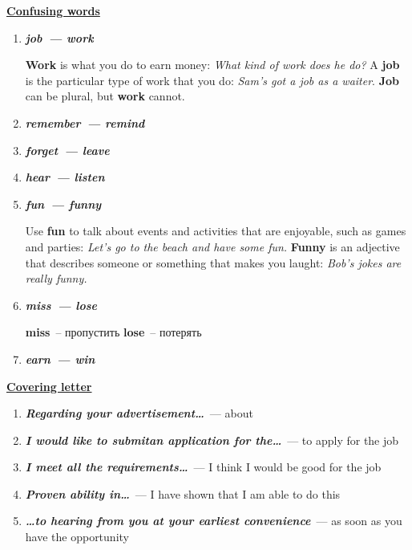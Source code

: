 \documentclass[10pt,a4paper]{article}
\newcommand\ex[1]{\textit{\textbf{{#1}}}}
\begin{document}
\textbf{\underline{Confusing words}}
\begin{enumerate}
  \item \ex{job~--- work}
  
  \textbf{Work} is what you do to earn money: \textit{What kind of work does he do?} A \textbf{job} is the particular type of work that you do: \textit{Sam's got a job as a waiter}. \textbf{Job} can be plural, but \textbf{work} cannot.
  \item \ex{remember~--- remind}
  \item \ex{forget~--- leave}
  \item \ex{hear~--- listen}
  \item \ex{fun~--- funny}
  
  Use \textbf{fun} to talk about events and activities that are enjoyable, such as games and parties: \textit{Let's go to the beach and have some fun.} \textbf{Funny} is an adjective that describes someone or something that makes you laught: \textit{Bob's jokes are really funny.}
  \item \ex{miss~--- lose}
  
  \textbf{miss}~-- пропустить
  \textbf{lose}~-- потерять
  \item \ex{earn~--- win}
  
\end{enumerate}

\par\medskip\textbf{\underline{Covering letter}}
\begin{enumerate}
  \item \ex{Regarding your advertisement\dots}~--- about
  \item \ex{I would like to submitan application for the\dots}~--- to apply for the job
  \item \ex{I meet all the requirements\dots}~--- I think I would be good for the job
  \item \ex{Proven ability in\dots}~--- I have shown that I am able to do this
  \item \ex{\dots to hearing from you at your earliest convenience}~--- as soon as you have the opportunity
\end{enumerate}
\end{document}
